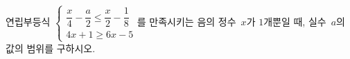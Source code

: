 연립부등식 $\begin{cases} \dfrac{x}{4}-\dfrac{a}{2}\le\dfrac{x}{2}-\dfrac{1}{8} \\ 4x+1\ge 6x-5 \end{cases}$를 만족시키는 음의 정수~$x$가 $1$개뿐일 때, 실수~$a$의 값의 범위를 구하시오.

